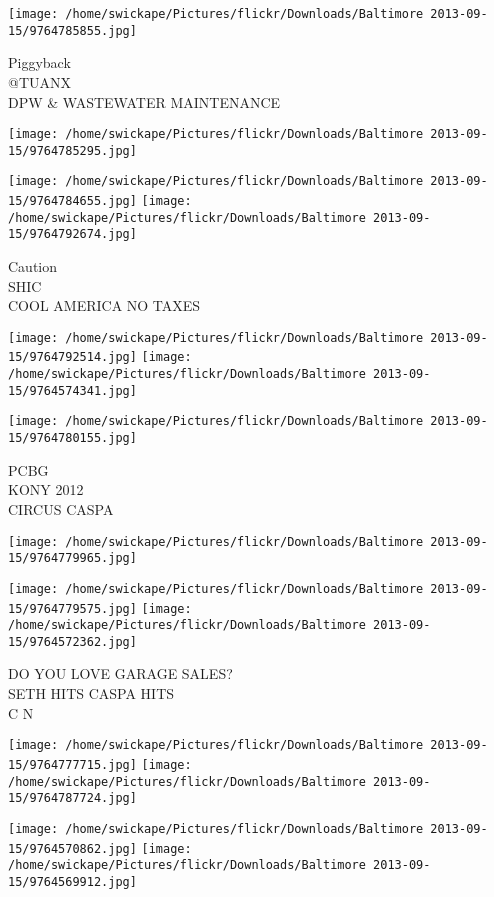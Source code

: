 \documentclass[10pt,letterpaper]{article}
\begin{document}
\texttt{[image: /home/swickape/Pictures/flickr/Downloads/Baltimore 2013-09-15/9764785855.jpg]}

Piggyback\\
@TUANX\\
DPW \& WASTEWATER MAINTENANCE
\pagebreak

\texttt{[image: /home/swickape/Pictures/flickr/Downloads/Baltimore 2013-09-15/9764785295.jpg]}

\vspace{0.25in}
\texttt{[image: /home/swickape/Pictures/flickr/Downloads/Baltimore 2013-09-15/9764784655.jpg]}
\texttt{[image: /home/swickape/Pictures/flickr/Downloads/Baltimore 2013-09-15/9764792674.jpg]}

Caution\\
SHIC\\
COOL AMERICA NO TAXES
\pagebreak

\texttt{[image: /home/swickape/Pictures/flickr/Downloads/Baltimore 2013-09-15/9764792514.jpg]}
\texttt{[image: /home/swickape/Pictures/flickr/Downloads/Baltimore 2013-09-15/9764574341.jpg]}

\texttt{[image: /home/swickape/Pictures/flickr/Downloads/Baltimore 2013-09-15/9764780155.jpg]}

PCBG\\
KONY 2012\\
CIRCUS CASPA
\pagebreak

\texttt{[image: /home/swickape/Pictures/flickr/Downloads/Baltimore 2013-09-15/9764779965.jpg]}

\vspace{0.25in}
\texttt{[image: /home/swickape/Pictures/flickr/Downloads/Baltimore 2013-09-15/9764779575.jpg]}
\texttt{[image: /home/swickape/Pictures/flickr/Downloads/Baltimore 2013-09-15/9764572362.jpg]}

DO YOU LOVE GARAGE SALES?\\
SETH HITS CASPA HITS\\
C N
\pagebreak

\texttt{[image: /home/swickape/Pictures/flickr/Downloads/Baltimore 2013-09-15/9764777715.jpg]}
\texttt{[image: /home/swickape/Pictures/flickr/Downloads/Baltimore 2013-09-15/9764787724.jpg]}

\texttt{[image: /home/swickape/Pictures/flickr/Downloads/Baltimore 2013-09-15/9764570862.jpg]}
\texttt{[image: /home/swickape/Pictures/flickr/Downloads/Baltimore 2013-09-15/9764569912.jpg]}
\end{document}
